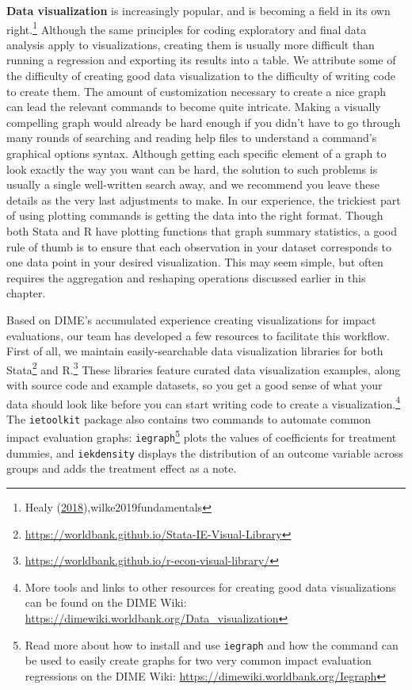\documentclass[
]{book}
\begin{document}
\textbf{Data visualization} is increasingly popular,
and is becoming a field in its own right.\footnote{Healy (\protect\hyperlink{ref-healy2018data}{2018}),wilke2019fundamentals}
Although the same principles for coding exploratory and final data analysis apply to visualizations,
creating them is usually more difficult than running a regression and exporting its results into a table.
We attribute some of the difficulty of creating good data visualization
to the difficulty of writing code to create them.
The amount of customization necessary to create a nice graph can lead the relevant commands to become quite intricate.
Making a visually compelling graph would already be hard enough if
you didn't have to go through many rounds of searching and reading help files
to understand a command's graphical options syntax.
Although getting each specific element of a graph to look exactly the way you want can be hard,
the solution to such problems is usually a single well-written search away,
and we recommend you leave these details as the very last adjustments to make.
In our experience, the trickiest part of using plotting commands is getting the data into the right format.
Though both Stata and R have plotting functions that graph summary statistics,
a good rule of thumb is to ensure that each
observation in your dataset corresponds to one data point in your desired visualization.
This may seem simple,
but often requires the aggregation and reshaping operations
discussed earlier in this chapter.

Based on DIME's accumulated experience creating visualizations for impact evaluations,
our team has developed a few resources to facilitate this workflow.
First of all, we maintain easily-searchable data visualization libraries for both Stata\footnote{\url{https://worldbank.github.io/Stata-IE-Visual-Library}} and R.\footnote{\url{https://worldbank.github.io/r-econ-visual-library/}}
These libraries feature curated data visualization examples, along with source code and example datasets,
so you get a good sense of what your data should look like
before you can start writing code to create a visualization.\footnote{More tools and links to other resources for creating good data visualizations
  can be found on the DIME Wiki:
  \url{https://dimewiki.worldbank.org/Data_visualization}}
The \texttt{ietoolkit} package also contains two commands to automate
common impact evaluation graphs:
\texttt{iegraph}\footnote{Read more about how to install and use \texttt{iegraph} and
  how the command can be used to easily create graphs
  for two very common impact evaluation regressions
  on the DIME Wiki:
  \url{https://dimewiki.worldbank.org/Iegraph}}
plots the values of coefficients for treatment dummies,
and \texttt{iekdensity} displays the distribution of an outcome variable
across groups and adds the treatment effect as a note.
\end{document}
